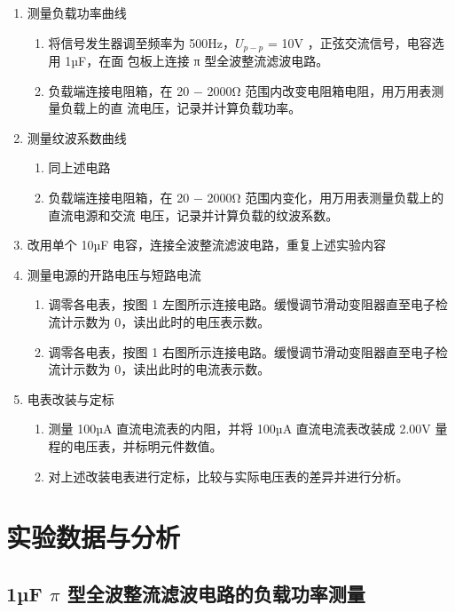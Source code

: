 \documentclass[10pt,a4paper]{article}
\begin{document}
	\begin{enumerate}
		\item 测量负载功率曲线\begin{enumerate}
		\item 将信号发生器调至频率为 500Hz，$U_{p−p}$ = 10V ，正弦交流信号，电容选用 1µF，在面
		包板上连接 π 型全波整流滤波电路。
		\item 负载端连接电阻箱，在 20 $-$ 2000Ω 范围内改变电阻箱电阻，用万用表测量负载上的直
		流电压，记录并计算负载功率。
		\end{enumerate}
		\item 测量纹波系数曲线\begin{enumerate}
			\item 同上述电路
			\item 负载端连接电阻箱，在 20 $-$ 2000Ω 范围内变化，用万用表测量负载上的直流电源和交流
			电压，记录并计算负载的纹波系数。
		\end{enumerate}
		\item 改用单个 10µF 电容，连接全波整流滤波电路，重复上述实验内容
		\item 测量电源的开路电压与短路电流\begin{enumerate}
		\item 调零各电表，按图 1 左图所示连接电路。缓慢调节滑动变阻器直至电子检流计示数为 0，读出此时的电压表示数。
		\item 调零各电表，按图 1 右图所示连接电路。缓慢调节滑动变阻器直至电子检流计示数为 0，读出此时的电流表示数。
		\end{enumerate}
		\item 电表改装与定标\begin{enumerate}
		\item 测量 100µA 直流电流表的内阻，并将 100µA 直流电流表改装成 2.00V
		量程的电压表，并标明元件数值。
		\item 对上述改装电表进行定标，比较与实际电压表的差异并进行分析。
		\end{enumerate}
	\end{enumerate}

	\section{实验数据与分析}

	\subsection{1µF $\pi$ 型全波整流滤波电路的负载功率测量}
\end{document}
